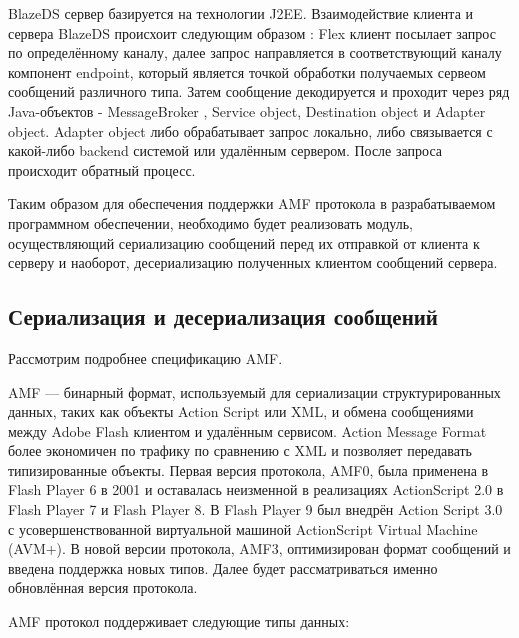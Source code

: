 BlazeDS сервер базируется на технологии J2EE. Взаимодействие клиента и сервера BlazeDS происхоит следующим 
образом : Flex клиент посылает запрос по определённому каналу, далее запрос направляется в соответствующий каналу 
компонент endpoint, который является точкой обработки получаемых сервеом сообщений различного типа. Затем сообщение 
декодируется и проходит через ряд Java-объектов - MessageBroker , Service object, Destination object и Adapter object.
Adapter object либо обрабатывает запрос локально, либо связывается с какой-либо backend системой или
удалённым сервером. После запроса происходит обратный процесс.
 
Таким образом для обеспечения поддержки AMF протокола в разрабатываемом программном 
обеспечении, необходимо будет реализовать модуль, осуществляющий сериализацию сообщений 
перед их отправкой от клиента к серверу и наоборот, десериализацию полученных клиентом сообщений 
сервера.

\subsection{Сериализация и десериализация сообщений}

Рассмотрим подробнее спецификацию AMF.

AMF --- бинарный формат, используемый для сериализации структурированных данных, таких как объекты Action Script или
XML, и обмена сообщениями между Adobe Flash клиентом и удалённым сервисом\cite{amf}. Action Message Format более экономичен
по трафику по сравнению с XML и позволяет передавать типизированные объекты. Первая версия протокола, AMF0, была 
применена в Flash Player 6 в 2001 и оставалась неизменной в реализациях ActionScript 2.0 в Flash Player 7 и Flash 
Player 8. В Flash Player 9 был внедрён Action Script 3.0 с усовершенствованной виртуальной машиной 
ActionScript Virtual Machine (AVM+). В новой версии протокола, AMF3, оптимизирован формат сообщений и введена 
поддержка новых типов. Далее будет рассматриваться именно обновлённая версия протокола.

AMF протокол поддерживает следующие типы данных:

